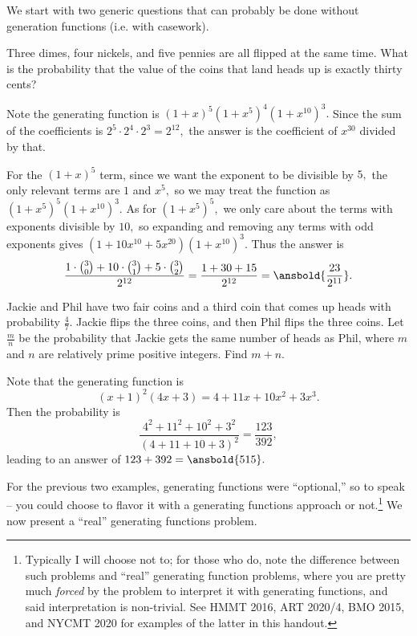 \documentclass{article}
\begin{document}
We start with two generic questions that can probably be done without generation functions (i.e. with casework).

\begin{exam}
Three dimes, four nickels, and five pennies are all flipped at the same time. What is the probability that the value of the coins that land heads up is exactly thirty cents?
\end{exam}

\begin{sol}
Note the generating function is $(1+x)^5(1+x^5)^4(1+x^{10})^3.$ Since the sum of the coefficients is $2^5\cdot 2^4\cdot 2^3=2^{12},$ the answer is the coefficient of $x^{30}$ divided by that.

For the $(1+x)^5$ term, since we want the exponent to be divisible by $5,$ the only relevant terms are $1$ and $x^5,$ so we may treat the function as $(1+x^5)^5(1+x^{10})^3.$ As for $(1+x^5)^5,$ we only care about the terms with exponents divisible by $10,$ so expanding and removing any terms with odd exponents gives $(1+10x^{10}+5x^{20})(1+x^{10})^3.$ Thus the answer is
\[\frac{1\cdot\binom{3}{0}+10\cdot \binom{3}{1}+5\cdot\binom{3}{2}}{2^{12}}=\frac{1+30+15}{2^{12}}=\ansbold{\frac{23}{2^{11}}}.\]
\end{sol}

\begin{exam}[AIME I 2010/4]
Jackie and Phil have two fair coins and a third coin that comes up heads with probability $\frac47$. Jackie flips the three coins, and then Phil flips the three coins. Let $\frac {m}{n}$ be the probability that Jackie gets the same number of heads as Phil, where $m$ and $n$ are relatively prime positive integers. Find $m + n$. 
\end{exam}

\begin{sol}
Note that the generating function is
\[(x+1)^2(4x+3)=4+11x+10x^2+3x^3.\]
Then the probability is
\[\frac{4^2+11^2+10^2+3^2}{(4+11+10+3)^2}=\frac{123}{392},\]
leading to an answer of $123+392=\ansbold{515}.$
\end{sol}

For the previous two examples, generating functions were ``optional,'' so to speak -- you could choose to flavor it with a generating functions approach or not.\footnote{Typically I will choose not to; for those who do, note the difference between such problems and ``real'' generating function problems, where you are pretty much \textit{forced} by the problem to interpret it with generating functions, and said interpretation is non-trivial. See HMMT 2016, ART 2020/4, BMO 2015, and NYCMT 2020 for examples of the latter in this handout.} We now present a ``real'' generating functions problem.
\end{document}
